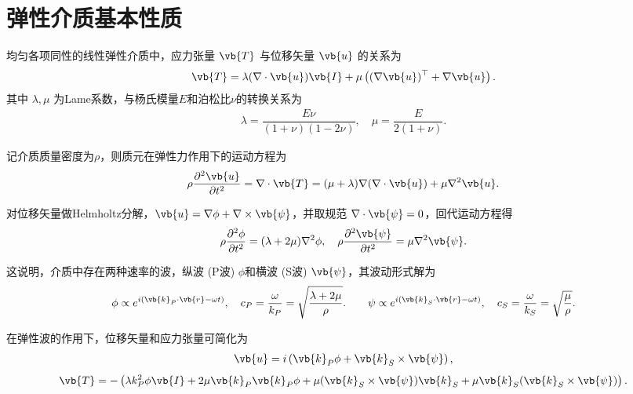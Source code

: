 \section{弹性介质基本性质}

均匀各项同性的线性弹性介质中，应力张量 \(\vb{T}\) 与位移矢量 \(\vb{u}\) 的关系为
\begin{align*}
	\vb{T} = \lambda (\nabla \cdot \vb{u}) \vb{I} + \mu \left( (\nabla \vb{u})^\top + \nabla \vb{u} \right).
\end{align*}
其中 \(\lambda, \mu\) 为Lame系数，与杨氏模量\(E\)和泊松比\(\nu\)的转换关系为
\begin{align*}
	\lambda = \dfrac{E\nu}{(1 + \nu)(1 - 2\nu)}, \quad \mu = \dfrac{E}{2(1 + \nu)}.
\end{align*}

记介质质量密度为\(\rho\)，则质元在弹性力作用下的运动方程为
\begin{align*}
	\rho \dfrac{\partial^2 \vb{u}}{\partial t^2} = \nabla \cdot \vb{T} = (\mu + \lambda) \nabla (\nabla \cdot \vb{u}) + \mu \nabla^2 \vb{u}.
\end{align*}

对位移矢量做Helmholtz分解，\(\vb{u} = \nabla \phi + \nabla \times \vb{\psi}\)，并取规范 \(\nabla \cdot \vb{\psi} = 0\)，回代运动方程得
\begin{align*}
	\rho \dfrac{\partial^2 \phi}{\partial t^2} = (\lambda + 2\mu) \nabla^2 \phi, \quad \rho \dfrac{\partial^2 \vb{\psi}}{\partial t^2} = \mu \nabla^2 \vb{\psi}.
\end{align*}

这说明，介质中存在两种速率的波，纵波 (P波) \(\phi\)和横波 (S波) \(\vb{\psi}\)，其波动形式解为
\begin{align*}
	\phi \propto e^{i(\vb{k}_P \cdot \vb{r} - \omega t)}, \quad c_P = \dfrac{\omega}{k_P} = \sqrt{\dfrac{\lambda + 2\mu}{\rho}}.\qquad{\psi} \propto e^{i(\vb{k}_S \cdot \vb{r} - \omega t)}, \quad c_S = \dfrac{\omega}{k_S} = \sqrt{\dfrac{\mu}{\rho}}.
\end{align*}

在弹性波的作用下，位移矢量和应力张量可简化为
\begin{align*}
	\vb{u} = i \left( \vb{k}_P \phi + \vb{k}_S \times \vb{\psi} \right),
\end{align*}
\begin{align*}
	\vb{T} = -\left( \lambda k_P^2 \phi \vb{I} + 2\mu \vb{k}_P \vb{k}_P \phi + \mu (\vb{k}_S \times \vb{\psi}) \vb{k}_S + \mu \vb{k}_S (\vb{k}_S \times \vb{\psi}) \right).
\end{align*}

